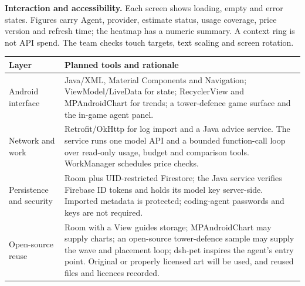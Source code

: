 \documentclass[10pt,a4paper]{article}
\newcommand{\sect}[1]{\vspace{3pt}{\large\bfseries#1}\par\vspace{1pt}}
\newcommand{\smallhead}[1]{{\bfseries#1}}
\begin{document}
\begin{center}
\end{center}
\vspace{-2pt}
\smallhead{Interaction and accessibility.} Each screen shows loading, empty and error states. Figures carry Agent, provider, estimate status, usage coverage, price version and refresh time; the heatmap has a numeric summary. A context ring is not API spend. The team checks touch targets, text scaling and screen rotation.

\sect{8. Technology and responsible reuse}
\begin{tabularx}{\linewidth}{@{}>{\raggedright\arraybackslash}p{33mm}Y@{}}
\toprule
{}
\textbf{Layer} & \textbf{Planned tools and rationale} \\
\midrule
Android interface & Java/XML, Material Components and Navigation; ViewModel/LiveData for state; RecyclerView and MPAndroidChart for trends; a tower-defence game surface and the in-game agent panel. \\
Network and work & Retrofit/OkHttp for log import and a Java advice service. The service runs one model API and a bounded function-call loop over read-only usage, budget and comparison tools. WorkManager schedules price checks. \\
Persistence and security & Room plus UID-restricted Firestore; the Java service verifies Firebase ID tokens and holds its model key server-side. Imported metadata is protected; coding-agent passwords and keys are not required. \\
Open-source reuse & Room with a View guides storage; MPAndroidChart may supply charts; an open-source tower-defence sample may supply the wave and placement loop; dsh-pet inspires the agent's entry point. Original or properly licensed art will be used, and reused files and licences recorded. \\
\bottomrule
\end{tabularx}
\end{document}
